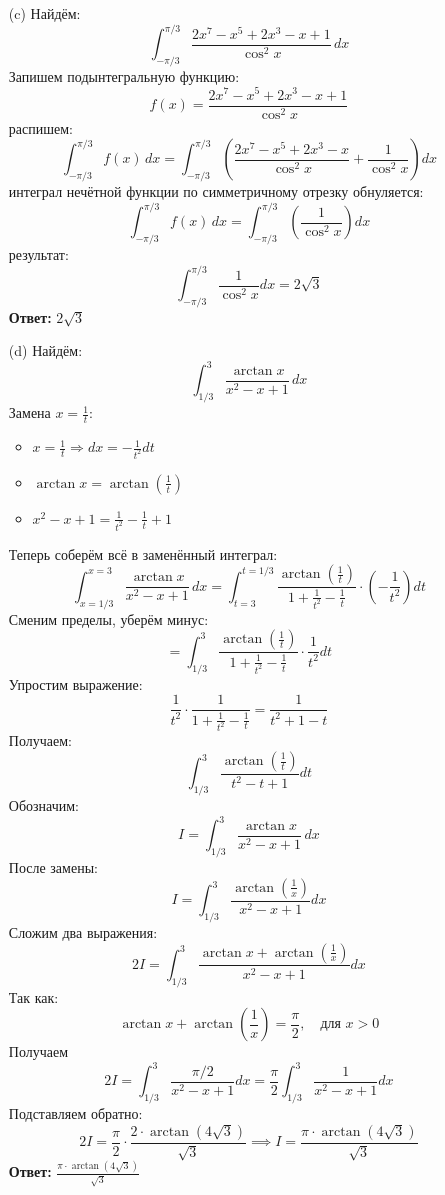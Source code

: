 \documentclass[a4paper]{article}
\begin{document}
\begin{enumerate}
\begin{enumerate}
        \item[(c)]Найдём:
        \[
        \int_{-\pi/3}^{\pi/3} \frac{2x^7 - x^5 + 2x^3 - x + 1}{\cos^2 x} \, dx
        \]
        Запишем подынтегральную функцию:
        \[
        f(x) = \frac{2x^7 - x^5 + 2x^3 - x + 1}{\cos^2 x}
        \]  
        распишем:
        \[
        \int_{-\pi/3}^{\pi/3} f(x) \, dx = \int_{-\pi/3}^{\pi/3} \left( \frac{2x^7 - x^5 + 2x^3 - x}{\cos^2 x} + \frac{1}{\cos^2 x} \right) dx
        \]
        интеграл нечётной функции по симметричному отрезку обнуляется:
        \[
        \int_{-\pi/3}^{\pi/3} f(x) \, dx = \int_{-\pi/3}^{\pi/3} \left( \frac{1}{\cos^2 x} \right) dx
        \]
        результат:
        \[
        \int_{-\pi/3}^{\pi/3} \frac{1}{\cos^2 x} dx = 2\sqrt{3}
        \]
        \textbf{Ответ: } $2\sqrt{3}$\\

        \item[(d)]Найдём:
        \[
        \int_{1/3}^{3} \frac{\arctan x}{x^2 - x + 1} \, dx
        \]
        Замена \( x = \frac{1}{t} \):
        \begin{itemize}
            \item  \( x = \frac{1}{t} \Rightarrow dx = -\frac{1}{t^2} dt \)
            \item \( \arctan x = \arctan\left( \frac{1}{t} \right) \)
            \item \( x^2 - x + 1 = \frac{1}{t^2} - \frac{1}{t} + 1 \)
        \end{itemize}
        Теперь соберём всё в заменённый интеграл:
        \[
        \int_{x=1/3}^{x=3} \frac{\arctan x}{x^2 - x + 1} \, dx = \int_{t=3}^{t=1/3} \frac{\arctan\left(\frac{1}{t}\right)}{1 + \frac{1}{t^2} - \frac{1}{t}} \cdot \left( -\frac{1}{t^2} \right) dt
        \]
        Сменим пределы, уберём минус:
        \[
        = \int_{1/3}^{3} \frac{\arctan\left(\frac{1}{t}\right)}{1 + \frac{1}{t^2} - \frac{1}{t}} \cdot \frac{1}{t^2} dt
        \]
        Упростим выражение:
        \[
        \frac{1}{t^2} \cdot \frac{1}{1 + \frac{1}{t^2} - \frac{1}{t}} = \frac{1}{t^2 + 1 - t}
        \]
        Получаем:
        \[
        \int_{1/3}^{3} \frac{\arctan\left(\frac{1}{t}\right)}{t^2 - t + 1} dt
        \]
        Обозначим:
        \[
        I = \int_{1/3}^{3} \frac{\arctan x}{x^2 - x + 1} \, dx
        \]
        После замены:
        \[
        I = \int_{1/3}^{3} \frac{\arctan\left( \frac{1}{x} \right)}{x^2 - x + 1} dx
        \]
        Сложим два выражения:
        \[
        2I = \int_{1/3}^{3} \frac{\arctan x + \arctan \left( \frac{1}{x} \right)}{x^2 - x + 1} dx
        \]
        Так как:
        \[
        \arctan x + \arctan \left( \frac{1}{x} \right) = \frac{\pi}{2}, \quad \text{для } x > 0
        \]
        Получаем
        \[
        2I = \int_{1/3}^{3} \frac{\pi/2}{x^2 - x + 1} dx = \frac{\pi}{2} \int_{1/3}^{3} \frac{1}{x^2 - x + 1} dx
        \]
        Подставляем обратно:
        \[
        2I = \frac{\pi}{2} \cdot \frac{2 \cdot \arctan(4\sqrt{3})}{\sqrt{3}} \implies I = \frac{\pi \cdot \arctan(4\sqrt{3})}{\sqrt{3}}
        \]
        \textbf{Ответ: } $\frac{\pi \cdot \arctan(4\sqrt{3})}{\sqrt{3}}$\\


\end{enumerate}
\end{enumerate}
\end{document}
